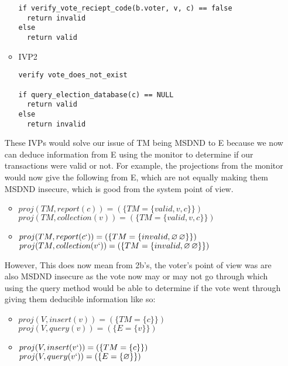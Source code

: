 \documentclass[journal,onecolumn]{IEEEtran}
\begin{document}
\begin{enumerate}
\begin{itemize}
\begin{lstlisting}
if verify_vote_reciept_code(b.voter, v, c) == false
  return invalid
else
  return valid
\end{lstlisting}

  \item IVP2
\begin{lstlisting}
verify vote_does_not_exist

if query_election_database(c) == NULL
  return valid
else
  return invalid
\end{lstlisting}
\end{itemize}

These IVPs would solve our issue of TM being MSDND to E because we now can deduce information from E using the monitor to determine if our transactions were valid or not. For example, the projections from the monitor would now give the following from E, which are not equally making them MSDND insecure, which is good from the system point of view.

\begin{itemize}
  \item $proj(TM, report(c)) = (\{TM = \{valid, v, c\}\})$ \\
  $proj(TM, collection(v)) = (\{TM = \{valid, v, c\}\})$ \\
  \item $proj(TM, report(c`)) = (\{TM = \{invalid, \varnothing\, \varnothing\}\})$ \\
  $proj(TM, collection(v`)) = (\{TM = \{invalid, \varnothing\, \varnothing\}\})$ \\
\end{itemize}

However, This does now mean from 2b's, the voter's point of view was are also MSDND insecure as the vote now may or may not go through which using the query method would be able to determine if the vote went through giving them deducible information like so: \\

\begin{itemize}
  \item $proj(V, insert(v)) = (\{TM = \{c\}\})$ \\
  $proj(V, query(v)) = (\{E = \{v\}\})$ \\
  \item $proj(V, insert(v`)) = (\{TM = \{c\}\})$ \\
  $proj(V, query(v`)) = (\{E = \{\varnothing\}\})$ \\
\end{itemize}

\end{enumerate}
\end{document}
